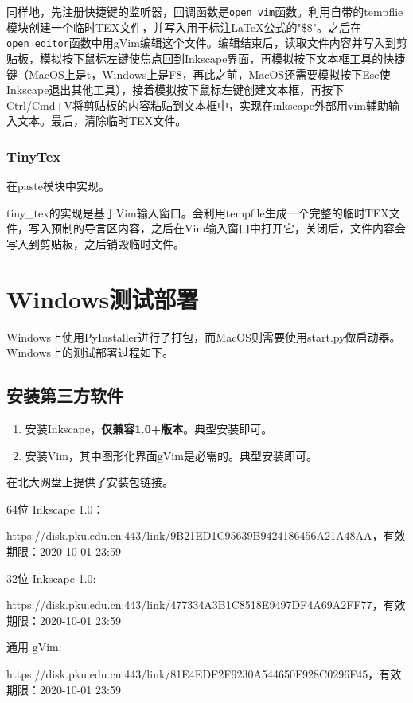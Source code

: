 \documentclass[AutoFakeBold,letterpaper,12pt,hidelinks]{article}
\begin{document}
同样地，先注册快捷键的监听器，回调函数是\texttt{open\_vim}函数。利用自带的tempflie模块创建一个临时TEX文件，并写入用于标注LaTeX公式的"\$\$"。之后在\texttt{open\_editor}函数中用gVim编辑这个文件。编辑结束后，读取文件内容并写入到剪贴板，模拟按下鼠标左键使焦点回到Inkscape界面，再模拟按下文本框工具的快捷键（MacOS上是t，Windows上是F8，再此之前，MacOS还需要模拟按下Esc使Inkscape退出其他工具），接着模拟按下鼠标左键创建文本框，再按下Ctrl/Cmd+V将剪贴板的内容粘贴到文本框中，实现在inkscape外部用vim辅助输入文本。最后，清除临时TEX文件。

\subsubsection{TinyTex}
在paste模块中实现。

tiny\_tex的实现是基于Vim输入窗口。会利用tempfile生成一个完整的临时TEX文件，写入预制的导言区内容，之后在Vim输入窗口中打开它，关闭后，文件内容会写入到剪贴板，之后销毁临时文件。

\section{Windows测试部署}

Windows上使用PyInstaller进行了打包，而MacOS则需要使用start.py做启动器。Windows上的测试部署过程如下。

\subsection{安装第三方软件}
\begin{enumerate}
\def\labelenumi{\arabic{enumi}.}
\item
    安装Inkscape，\textbf{仅兼容1.0+版本}。典型安装即可。
\item
    安装Vim，其中图形化界面gVim是必需的。典型安装即可。
\end{enumerate}

在北大网盘上提供了安装包链接。

64位 Inkscape
1.0：

https://disk.pku.edu.cn:443/link/9B21ED1C95639B9424186456A21A48AA，有效期限：2020-10-01
23:59

32位 Inkscape 1.0:

https://disk.pku.edu.cn:443/link/477334A3B1C8518E9497DF4A69A2FF77，有效期限：2020-10-01
23:59

通用 gVim:

https://disk.pku.edu.cn:443/link/81E4EDF2F9230A544650F928C0296F45，有效期限：2020-10-01
23:59
\end{document}
